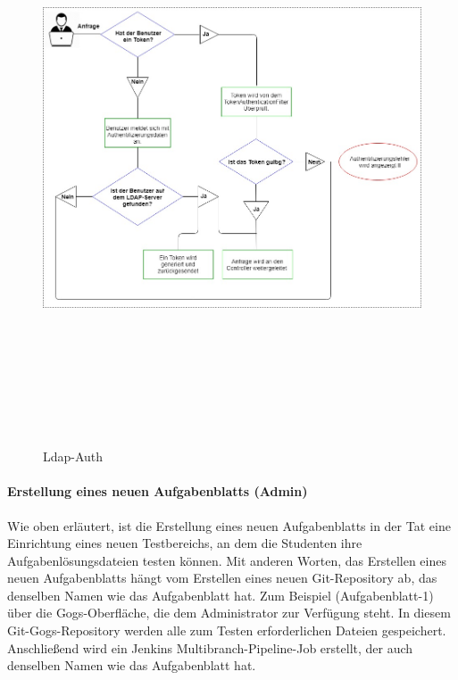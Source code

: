 \documentclass[apaper4,12p]{scrartcl}
\begin{document}
\begin{figure}[h!]
	\begin{center}
		\includegraphics[width=15cm, height=17cm]{Ldap-Auth.jpg}
		\caption{Ldap-Auth } 
		\label{ Ldap-Auth } 
	\end{center}
\end{figure}

\paragraph{Erstellung eines neuen Aufgabenblatts (Admin)}
Wie oben erläutert, ist die Erstellung eines neuen Aufgabenblatts in der Tat eine Einrichtung eines neuen Testbereichs, an dem die Studenten ihre Aufgabenlösungsdateien testen können. Mit anderen Worten, das Erstellen eines neuen Aufgabenblatts hängt vom Erstellen eines neuen Git-Repository ab, das denselben Namen wie das Aufgabenblatt hat. Zum Beispiel (Aufgabenblatt-1) über die Gogs-Oberfläche, die dem Administrator zur Verfügung steht. In diesem Git-Gogs-Repository werden alle zum Testen erforderlichen Dateien gespeichert. Anschließend wird ein Jenkins Multibranch-Pipeline-Job erstellt, der auch denselben Namen wie das Aufgabenblatt hat.
\end{document}
